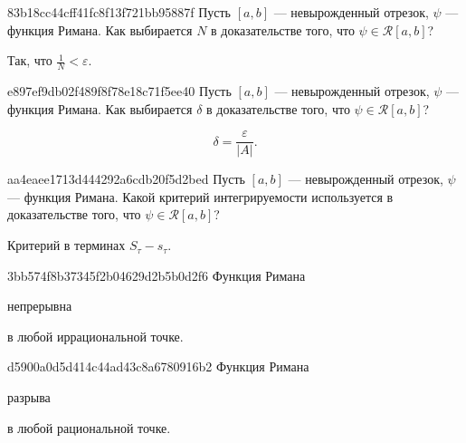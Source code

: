 \begin{note}{83b18cc44cff41fc8f13f721bb95887f}
    Пусть \({ [a, b]  }\) --- невырожденный отрезок, \({ \psi }\) --- функция Римана.
    Как выбирается \({ N }\) в доказательстве того, что \({ \psi \in \mathcal R[a, b] }\)?

    \begin{cloze}{1}
        Так, что \({ \frac{1}{N} < \varepsilon }\).
    \end{cloze}
\end{note}

\begin{note}{e897ef9db02f489f8f78e18c71f5ee40}
    Пусть \({ [a, b]  }\) --- невырожденный отрезок, \({ \psi }\) --- функция Римана.
    Как выбирается \({ \delta }\) в доказательстве того, что \({ \psi \in \mathcal R[a, b] }\)?

    \begin{cloze}{1}
        \[
            \delta = \frac{\varepsilon}{\left\lvert A \right\rvert}.
        \]
    \end{cloze}
\end{note}

\begin{note}{aa4eaee1713d444292a6cdb20f5d2bed}
    Пусть \({ [a, b]  }\) --- невырожденный отрезок, \({ \psi }\) --- функция Римана.
    Какой критерий интегрируемости используется в доказательстве того, что \({ \psi \in \mathcal R[a, b] }\)?

    \begin{cloze}{1}
        Критерий в терминах \({ S_\tau - s_\tau }\).
    \end{cloze}
\end{note}

\begin{note}{3bb574f8b37345f2b04629d2b5b0d2f6}
    Функция Римана \begin{icloze}{2}непрерывна\end{icloze} \begin{icloze}{1}в любой иррациональной точке.\end{icloze}
\end{note}

\begin{note}{d5900a0d5d414c44ad43c8a6780916b2}
    Функция Римана \begin{icloze}{2}разрыва\end{icloze} \begin{icloze}{1}в любой рациональной точке.\end{icloze}
\end{note}


